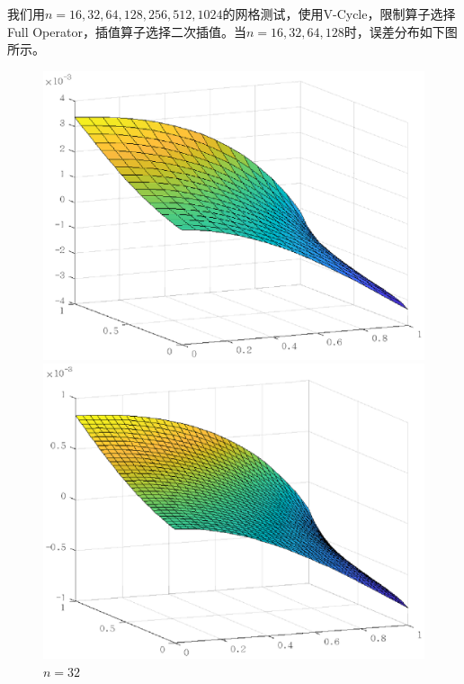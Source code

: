 \documentclass[lang=cn,10pt]{elegantbook}
\begin{document}
我们用$n=16,32,64,128,256,512,1024$的网格测试，使用V-Cycle，限制算子选择Full Operator，插值算子选择二次插值。当$n=16,32,64,128$时，误差分布如下图所示。
\begin{figure}[H]
  \centering
  \begin{minipage}[t]{0.24\linewidth}
      \centering
      \includegraphics[width=0.95\linewidth]{figure/2-2-1.eps}
      \caption*{$n=16$}
  \end{minipage}
  \begin{minipage}[t]{0.24\linewidth}
    \centering
    \includegraphics[width=0.95\linewidth]{figure/2-2-2.eps}
    \caption*{$n=32$}
  \end{minipage}
  \begin{minipage}[t]{0.24\linewidth}
    \centering

\end{minipage}
\end{figure}
\end{document}

